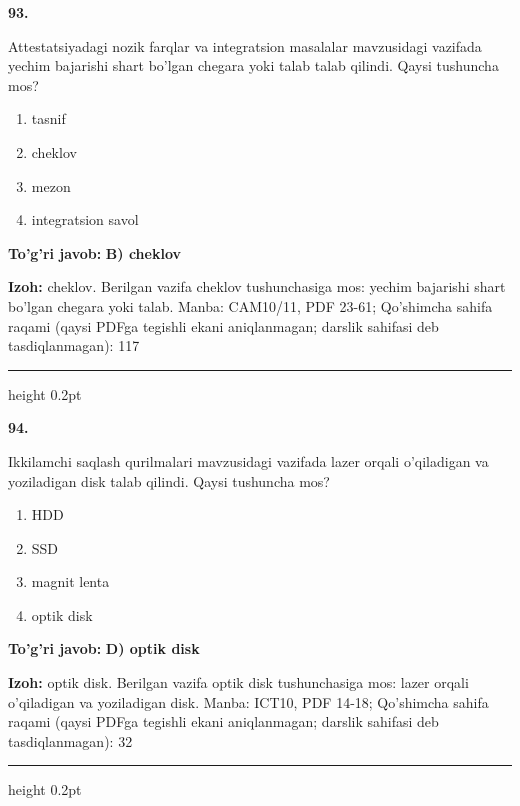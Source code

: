 \documentclass[10pt,a4paper]{article}
\begin{document}
{\bfseries\sffamily\color{ink} 93.}
\par
Attestatsiyadagi nozik farqlar va integratsion masalalar mavzusidagi vazifada yechim bajarishi shart bo'lgan chegara yoki talab talab qilindi. Qaysi tushuncha mos?
\begin{enumerate}[label=\Alph*),leftmargin=9mm]
\item tasnif
\item cheklov
\item mezon
\item integratsion savol
\end{enumerate}
\begin{tcolorbox}[enhanced,breakable,colback=teal!4,colframe=teal!60!black,boxrule=0.45pt,arc=1.2mm,left=2.7mm,right=2.7mm,top=1.8mm,bottom=1.8mm,before skip=2mm,after skip=2mm]
{\bfseries\sffamily\color{teal}To'g'ri javob:} \textbf{B) cheklov}
\par\smallskip
{\bfseries Izoh:} cheklov. Berilgan vazifa cheklov tushunchasiga mos: yechim bajarishi shart bo'lgan chegara yoki talab. Manba: CAM10/11, PDF 23-61; Qo'shimcha sahifa raqami (qaysi PDFga tegishli ekani aniqlanmagan; darslik sahifasi deb tasdiqlanmagan): 117
\end{tcolorbox}
\vspace{2mm}\hrule height 0.2pt\vspace{3mm}

{\bfseries\sffamily\color{ink} 94.}
\par
Ikkilamchi saqlash qurilmalari mavzusidagi vazifada lazer orqali o'qiladigan va yoziladigan disk talab qilindi. Qaysi tushuncha mos?
\begin{enumerate}[label=\Alph*),leftmargin=9mm]
\item HDD
\item SSD
\item magnit lenta
\item optik disk
\end{enumerate}
\begin{tcolorbox}[enhanced,breakable,colback=teal!4,colframe=teal!60!black,boxrule=0.45pt,arc=1.2mm,left=2.7mm,right=2.7mm,top=1.8mm,bottom=1.8mm,before skip=2mm,after skip=2mm]
{\bfseries\sffamily\color{teal}To'g'ri javob:} \textbf{D) optik disk}
\par\smallskip
{\bfseries Izoh:} optik disk. Berilgan vazifa optik disk tushunchasiga mos: lazer orqali o'qiladigan va yoziladigan disk. Manba: ICT10, PDF 14-18; Qo'shimcha sahifa raqami (qaysi PDFga tegishli ekani aniqlanmagan; darslik sahifasi deb tasdiqlanmagan): 32
\end{tcolorbox}
\vspace{2mm}\hrule height 0.2pt\vspace{3mm}
\end{document}
